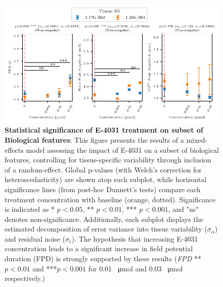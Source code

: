 \documentclass{report}
\begin{document}
    
            \begin{figure}[h]
                \centering
                \includegraphics[width=1.0\textwidth, keepaspectratio]{plots/chapter_5/e4031/significance_features_lmer_subset_3.pdf}
                \caption[Statistical significance of E-4031 treatment on subset of Biological features.]{\textbf{Statistical significance of E-4031 treatment on subset of Biological features}:  
                This figure presents the results of a mixed-effects model assessing the impact of E-4031 on a subset of biological features, controlling for tissue-specific variability through inclusion of a random-effect. Global p-values (with Welch's correction for heteroscedasticity) are shown atop each subplot, while horizontal significance lines (from post-hoc Dunnett’s tests) compare each treatment concentration with baseline (orange, dotted). Significance is indicated as * \(p < 0.05\), ** \(p < 0.01\), *** \(p < 0.001\), and "ns" denotes non-significance. Additionally, each subplot displays the estimated decomposition of error variance into tissue variability (\(\sigma_\alpha\)) and residual noise (\(\sigma_\epsilon\)). The hypothesis that increasing E-4031 concentration leads to a significant increase in field potential duration (FPD) is strongly supported by these results (\textit{FPD} **\(p < 0.01\) and ***\(p < 0.001\) for 0.01 \SI{}{\umol} and 0.03 \SI{}{\umol} respectively.)}
            
                \label{fig:sig_subset_e4031}
            \end{figure}
        
\end{document}
